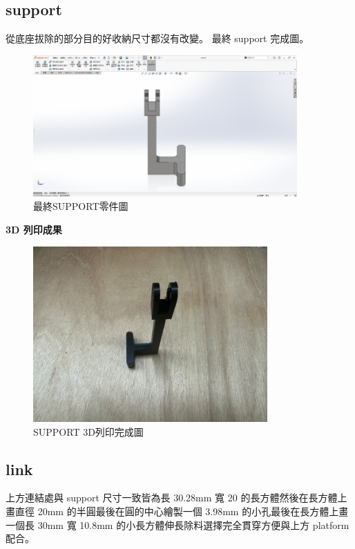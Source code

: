 \newpage

\subsection*{support}

從底座拔除的部分目的好收納尺寸都沒有改變。
最終 support 完成圖。

\begin{figure}[htbp]
    \centering
    \includegraphics[width=0.90\textwidth]{./../images/6-1-40}
    \caption{最終SUPPORT零件圖}
\end{figure}

\textbf{3D 列印成果}

\begin{figure}[htbp]
    \centering
    \includegraphics[width=0.80\textwidth]{./../images/6-1-24}
    \caption{SUPPORT 3D列印完成圖}
\end{figure}

\subsection*{link}

上方連結處與 support 尺寸一致皆為長 30.28mm 寬 20 的長方體然後在長方體上畫直徑 20mm 的半圓最後在圓的中心繪製一個 3.98mm 的小孔最後在長方體上畫一個長 30mm 寬 10.8mm 的小長方體伸長除料選擇完全貫穿方便與上方 platform 配合。

